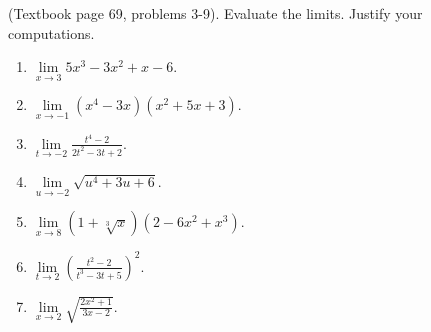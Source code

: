 (Textbook page 69, problems 3-9). 
Evaluate the limits. Justify your computations.
\begin{multicols}{3}
\begin{enumerate}
\item $\displaystyle\lim\limits_{x\to 3} 5x^3-3x^2+x-6$.
\item $\displaystyle\lim\limits_{x\to -1} (x^4-3x)(x^2+5x+3)$.
\item $\displaystyle\lim\limits_{t\to -2} \frac{t^4- 2}{2t^2 -3t +2} $.
\item $\displaystyle\lim\limits_{u\to -2}\sqrt{u^4+3u +6}$.
\item $\displaystyle\lim\limits_{x \to 8}(1+ \sqrt[3]{x} )(2- 6x^2 + x^3)$.
\item $\displaystyle\lim\limits_{t \to 2}\left( \frac{t^2 - 2 }{ t^3-3t+5} \right)^2$.
\item $\displaystyle\lim\limits_{x\to 2}\sqrt{ \frac{2x^2 + 1}{ 3x-2}}$.
\end{enumerate}
\end{multicols}
